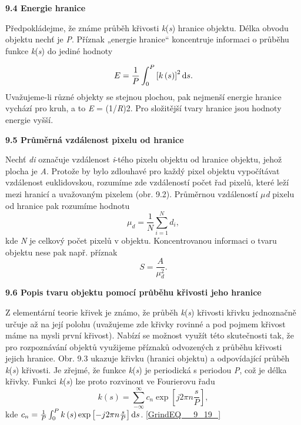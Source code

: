 \noindent 

\noindent \textbf{9.4  Energie hranice}

\noindent Předpokládejme, že známe průběh křivosti \textit{k}(\textit{s}) hranice objektu. Délka obvodu objektu nechť je \textit{P}. Příznak „energie hranice`` koncentruje informaci o průběhu funkce \textit{k}(\textit{s}) do jediné hodnoty

\noindent 
\begin{equation} \label{GrindEQ__9_15_} 
E=\frac{1}{P} \int _{0}^{P}\left[k\left(s\right)\right]^{2} {\rm d}s .  
\end{equation} 
Uvažujeme-li různé objekty se stejnou plochou, pak nejmenší energie hranice vychází pro kruh, a to \textit{E} = (1/\textit{R})2. Pro složitější tvary hranice jsou hodnoty energie vyšší.

\noindent \textbf{9.5  Průměrná vzdálenost pixelu od hranice}

\noindent 

\noindent Nechť \textit{di} označuje vzdálenost \textit{i}-tého pixelu objektu od hranice objektu, jehož plocha je \textit{A}. Protože by bylo zdlouhavé pro každý pixel objektu vypočítávat vzdálenost euklidovskou, rozumíme zde vzdáleností počet řad pixelů, které leží mezi hranicí a uvažovaným pixelem (obr. 9.2). Průměrnou vzdáleností $\mu$\textit{d} pixelu od hranice pak rozumíme hodnotu
\begin{equation} \label{GrindEQ__9_16_} 
\mu _{d} =\frac{1}{N} \sum _{i=1}^{N}d_{i}  ,  
\end{equation} 
kde \textit{N} je celkový počet pixelů v objektu. Koncentrovanou informaci o tvaru objektu nese pak např. příznak
\begin{equation} \label{GrindEQ__9_17_} 
S=\frac{A}{\mu _{d}^{2} } .  
\end{equation} 
   

\noindent \textbf{9.6  Popis tvaru objektu pomocí průběhu křivosti jeho hranice}

\noindent 

\noindent Z elementární teorie křivek je známo, že průběh \textit{k}(\textit{s}) křivosti křivku jednoznačně určuje až na její polohu (uvažujeme zde křivky rovinné a pod pojmem křivost máme na mysli první křivost). Nabízí se možnost využít této skutečnosti tak, že pro rozpoznávání objektů využijeme příznaků odvozených z průběhu křivosti jejich hranice. Obr. 9.3 ukazuje křivku (hranici objektu) a odpovídající průběh \textit{k}(\textit{s}) křivosti. Je zřejmé, že funkce \textit{k}(\textit{s}) je periodická s periodou \textit{P}, což je délka křivky. Funkci \textit{k}(\textit{s}) lze proto rozvinout ve Fourierovu řadu 
\begin{equation} \label{GrindEQ__9_18_} 
k\left(s\right)=\sum _{-\infty }^{\infty }c_{n} \exp \left[j2\pi n\frac{s}{P} \right] ,  
\end{equation} 
kde $c_{n} =\frac{1}{P} \int _{0}^{P}k\left(s\right)\exp \left[-j2\pi n\frac{s}{P} \right]{\rm d}s $. \eqref{GrindEQ__9_19_}

